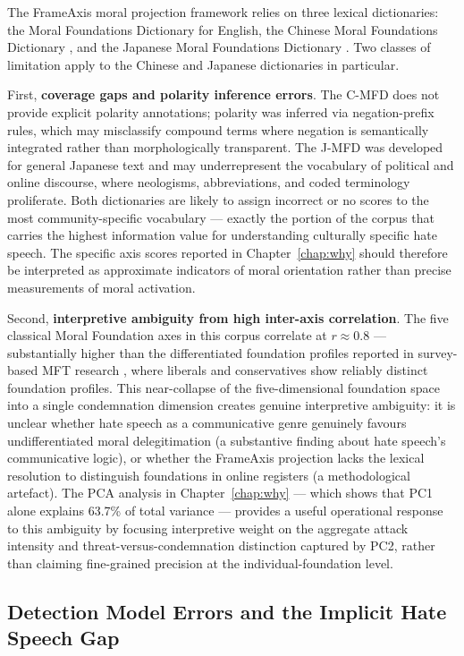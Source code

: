 \documentclass[../CLthesis.tex]{subfiles}
\begin{document}
The FrameAxis moral projection framework relies on three lexical dictionaries: the Moral Foundations Dictionary for English, the Chinese Moral Foundations Dictionary \citep{cheng_c-mfd_2023}, and the Japanese Moral Foundations Dictionary \citep{matsuo2019development}. Two classes of limitation apply to the Chinese and Japanese dictionaries in particular.

First, \textbf{coverage gaps and polarity inference errors}. The C-MFD does not provide explicit polarity annotations; polarity was inferred via negation-prefix rules, which may misclassify compound terms where negation is semantically integrated rather than morphologically transparent. The J-MFD was developed for general Japanese text and may underrepresent the vocabulary of political and online discourse, where neologisms, abbreviations, and coded terminology proliferate. Both dictionaries are likely to assign incorrect or no scores to the most community-specific vocabulary --- exactly the portion of the corpus that carries the highest information value for understanding culturally specific hate speech. The specific axis scores reported in Chapter~\ref{chap:why} should therefore be interpreted as approximate indicators of moral orientation rather than precise measurements of moral activation.

Second, \textbf{interpretive ambiguity from high inter-axis correlation}. The five classical Moral Foundation axes in this corpus correlate at $r \approx 0.8$ --- substantially higher than the differentiated foundation profiles reported in survey-based MFT research \citep{graham2009liberals}, where liberals and conservatives show reliably distinct foundation profiles. This near-collapse of the five-dimensional foundation space into a single condemnation dimension creates genuine interpretive ambiguity: it is unclear whether hate speech as a communicative genre genuinely favours undifferentiated moral delegitimation (a substantive finding about hate speech's communicative logic), or whether the FrameAxis projection lacks the lexical resolution to distinguish foundations in online registers (a methodological artefact). The PCA analysis in Chapter~\ref{chap:why} --- which shows that PC1 alone explains 63.7\% of total variance --- provides a useful operational response to this ambiguity by focusing interpretive weight on the aggregate attack intensity and threat-versus-condemnation distinction captured by PC2, rather than claiming fine-grained precision at the individual-foundation level.

\subsection{Detection Model Errors and the Implicit Hate Speech Gap}
\end{document}
